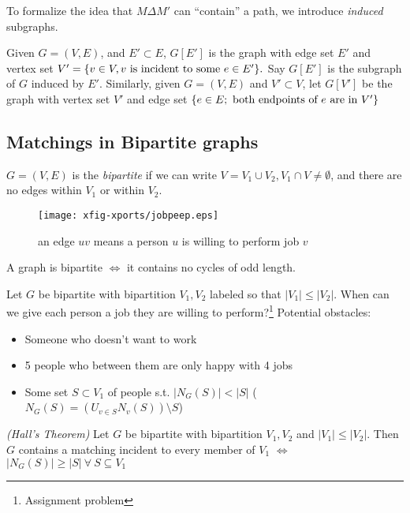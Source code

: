\documentclass{article}
\begin{document}
\begin{cav}
To formalize the idea that $M \Delta M'$ can ``contain'' a path, we introduce \emph{induced} subgraphs.
\end{cav}

Given $G=(V,E)$, and $E' \subset E$, $G[E']$ is the graph with edge set $E'$ and vertex set $V' = \{ v \in V, v \textmd{ is incident to some } e \in E'\}.$ Say $G[E']$ is the subgraph of $G$ induced by $E'$.  Similarly, given $G=(V,E)$ and $V' \subset V$, let $G[V']$ be the graph with vertex set $V'$ and edge set $\{e \in E; \textmd{ both endpoints of } e \textmd{ are in } V' \}$

\subsection*{Matchings in Bipartite graphs}

\begin{defn}
$G = (V,E)$ is the \emph{bipartite} if we can write $V=V_1 \cup V_2, V_1 \cap V \neq \emptyset$, and there are no edges within $V_1$ or within $V_2$.
\end{defn}

\begin{figure}
\centering
\caption{an edge $uv$ means a person $u$ is willing to perform job $v$}
\texttt{[image: xfig-xports/jobpeep.eps]}
\end{figure}


\begin{rem}
A graph is bipartite $\iff$ it contains no cycles of odd length.
\end{rem}

Let $G$ be bipartite with bipartition $V_1, V_2$ labeled so that $|V_1|\leq |V_2|$.  When can we give each person a job they are willing to perform?\footnote{Assignment problem} Potential obstacles: \begin{itemize}
 \item Someone who doesn't want to work
\item 5 people who between them are only happy with 4 jobs
\item Some set $S \subset V_1$ of people s.t. $|N_G (S)| < |S|$ ($N_G (S) = (\displaystyle U_{v \in S} N_v(S))\setminus S$)
\end{itemize}

\begin{thm}
\emph{(Hall's Theorem)} Let $G$ be bipartite with bipartition $V_1,V_2$ and $|V_1| \leq |V_2|$. Then $G$ contains a matching incident to every member of $V_1$ $\iff$ $|N_G(S)|\geq |S| ~ \forall ~S \subseteq V_1$
\end{thm}
\end{document}
